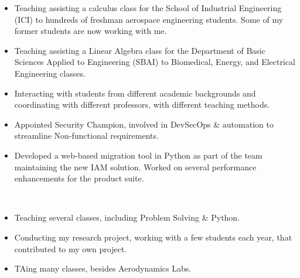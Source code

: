 	\begin{itemize}
		\item Teaching assisting a calculus class for the School of Industrial Engineering (ICI) to hundreds of freshman aerospace engineering students. Some of my former students are now working with me.
		\item Teaching assisting a Linear Algebra class for the Department of Basic Sciences Applied to Engineering (SBAI) to Biomedical, Energy, and Electrical Engineering classes.
		\item Interacting with students from different academic backgrounds and coordinating with different professors, with different teaching methods.
	\end{itemize}
\else
	\begin{itemize}
		\item Appointed Security Champion, involved in DevSecOps \& automation to streamline Non-functional requirements.
		\item Developed a web-based migration tool in Python as part of the team maintaining the new IAM solution. Worked on several performance enhancements for the product suite.
	\end{itemize}
	\smallskip
	 \\

	\divider

	\begin{itemize}
		\item Teaching several classes, including Problem Solving \& Python.
	\end{itemize}

	\divider


	\divider


	\divider

	\begin{itemize}
		\item Conducting my research project, working with a few students each year, that contributed to my own project.
		\item TAing many classes, besides Aerodynamics Labs.
	\end{itemize}
	\smallskip

